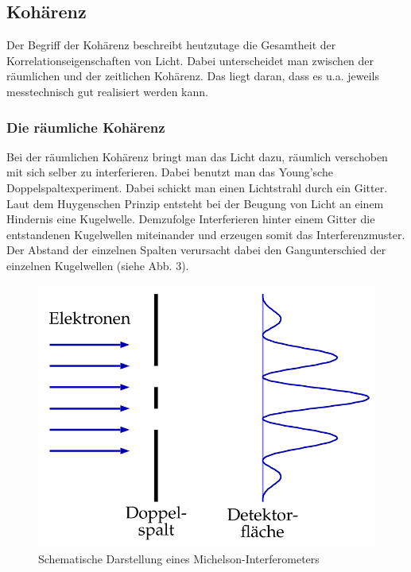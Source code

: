 \subsection{Kohärenz}
Der Begriff der Kohärenz beschreibt heutzutage die Gesamtheit der Korrelationseigenschaften von Licht. Dabei unterscheidet man zwischen der räumlichen und der zeitlichen Kohärenz. Das liegt daran, dass es u.a. jeweils messtechnisch gut realisiert werden kann.

\subsubsection{Die räumliche Kohärenz}
Bei der räumlichen Kohärenz bringt man das Licht dazu, räumlich verschoben mit sich selber zu interferieren. Dabei benutzt man das Young'sche Doppelspaltexperiment. Dabei schickt man einen Lichtstrahl durch ein Gitter. Laut dem Huygenschen Prinzip entsteht bei der Beugung von Licht an einem Hindernis eine Kugelwelle. Demzufolge Interferieren hinter einem Gitter die entstandenen Kugelwellen miteinander und erzeugen somit das Interferenzmuster. Der Abstand der einzelnen Spalten verursacht dabei den Gangunterschied der einzelnen Kugelwellen (siehe Abb. 3). 

\begin{figure}[h]
\begin{center}
\includegraphics[scale=0.8]{img/holo3}
\caption{Schematische Darstellung eines Michelson-Interferometers}
\end{center}
\end{figure}

